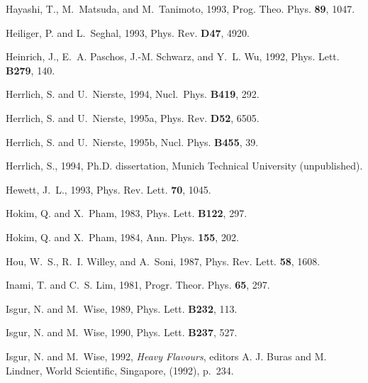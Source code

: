 \begin{thebibliography}{\protect{}1991}
Hayashi, T., M.~Matsuda, and M.~Tanimoto, 1993,
\newblock Prog. Theo. Phys. {\bf 89}, 1047.

Heiliger, P. and L.~Seghal, 1993,
\newblock Phys. Rev. {\bf D47}, 4920.

Heinrich, J., E.~A. Paschos, J.-M. Schwarz, and Y.~L. Wu, 1992,
\newblock Phys. Lett. {\bf B279}, 140.

Herrlich, S. and U.~Nierste, 1994,
\newblock Nucl.~Phys. {\bf B419}, 292.

Herrlich, S. and U.~Nierste, 1995a,
\newblock Phys. Rev. {\bf D52}, 6505.

Herrlich, S. and U.~Nierste, 1995b,
\newblock Nucl. Phys. {\bf B455}, 39.

Herrlich, S., 1994,
\newblock Ph.D. dissertation, Munich Technical University (unpublished).

Hewett, J.~L., 1993,
\newblock Phys. Rev. Lett. {\bf 70}, 1045.

Hokim, Q. and X.~Pham, 1983,
\newblock Phys. Lett. {\bf B122}, 297.

Hokim, Q. and X.~Pham, 1984,
\newblock Ann. Phys. {\bf 155}, 202.

Hou, W.~S., R.~I. Willey, and A.~Soni, 1987,
\newblock Phys. Rev. Lett. {\bf 58}, 1608.

Inami, T. and C.~S. Lim, 1981,
\newblock Progr. Theor. Phys. {\bf 65}, 297.

Isgur, N. and M.~Wise, 1989,
\newblock Phys. Lett. {\bf B232}, 113.

Isgur, N. and M.~Wise, 1990,
\newblock Phys. Lett. {\bf B237}, 527.

Isgur, N. and M.~Wise, 1992,
 {\em Heavy Flavours}, {\rm editors A. J. Buras and M.
  Lindner, World Scientific, Singapore, (1992), p.\ 234}.


\end{thebibliography}
